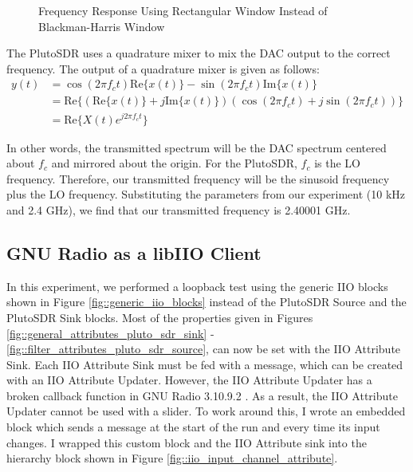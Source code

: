 \documentclass{article}
\begin{document}
\begin{figure}[H]
	\centerline{}
	\caption{Frequency Response Using Rectangular Window Instead of Blackman-Harris Window}
	\label{fig::gnu_radio_loopback_qt_gui_sink_rect_win}
\end{figure}

The PlutoSDR uses a quadrature mixer to mix the DAC output to the correct frequency. The output of a quadrature mixer is given as follows:
\begin{align}
	y(t) &= \cos(2{\pi}f_ct)\text{Re}\{x(t)\} - \sin(2{\pi}f_ct)\text{Im}\{x(t)\} \\
	&= \text{Re}\{(\text{Re}\{x(t)\} + j\text{Im}\{x(t)\})(\cos(2{\pi}f_ct) + j\sin(2{\pi}f_ct))\} \\
	&= \text{Re}\{X(t)e^{j2{\pi}f_ct}\}
\end{align}

In other words, the transmitted spectrum will be the DAC spectrum centered about $f_c$ and mirrored about the origin. For the PlutoSDR, $f_c$ is the LO frequency. Therefore, our transmitted frequency will be the sinusoid frequency plus the LO frequency. Substituting the parameters from our experiment (10 kHz and 2.4 GHz), we find that our transmitted frequency is 2.40001 GHz. 

\subsection{GNU Radio as a libIIO Client}

In this experiment, we performed a loopback test using the generic IIO blocks shown in Figure \ref{fig::generic_iio_blocks} instead of the PlutoSDR Source and the PlutoSDR Sink blocks. Most of the properties given in Figures \ref{fig::general_attributes_pluto_sdr_sink} - \ref{fig::filter_attributes_pluto_sdr_source}, can now be set with the IIO Attribute Sink. Each IIO Attribute Sink must be fed with a message, which can be created with an IIO Attribute Updater. However, the IIO Attribute Updater has a broken callback function in GNU Radio 3.10.9.2 \cite{analog_devices_broken_iio_block}. As a result, the IIO Attribute Updater cannot be used with a slider. To work around this, I wrote an embedded block which sends a message at the start of the run and every time its input changes. I wrapped this custom block and the IIO Attribute sink into the hierarchy block shown in Figure \ref{fig::iio_input_channel_attribute}.
\end{document}
